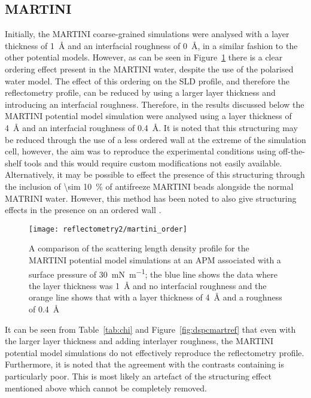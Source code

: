 \subsection{MARTINI}
Initially, the MARTINI coarse-grained simulations were analysed with a layer thickness of \SI{1}{\angstrom} and an interfacial roughness of \SI{0}{\angstrom}, in a similar fashion to the other potential models.
However, as can be seen in Figure~\ref{fig:martorder} there is a clear ordering effect present in the MARTINI water, despite the use of the polarised water model.
The effect of this ordering on the SLD profile, and therefore the reflectometry profile, can be reduced by using a larger layer thickness and introducing an interfacial roughness.
Therefore, in the results discussed below the MARTINI potential model simulation were analysed using a layer thickness of \SI{4}{\angstrom} and an interfacial roughness of \SI{0.4}{\angstrom}.
It is noted that this structuring may be reduced through the use of a less ordered wall \cite{koutsioubas_combined_2016} at the extreme of the simulation cell, however, the aim was to reproduce the experimental conditions using off-the-shelf tools and this would require custom modifications not easily available.
Alternatively, it may be possible to effect the presence of this structuring through the inclusion of \SI{\sim 10}{\percent} of antifreeze MARTINI beads alongside the normal MATRINI water.
However, this method has been noted to also give structuring effects in the presence on an ordered wall \cite{marrink_comment_2010}.
%
\begin{figure}
    \centering
    \texttt{[image: reflectometry2/martini\_order]}
    \caption{A comparison of the scattering length density profile for the MARTINI potential model simulations at an APM associated with a surface pressure of \SI{30}{\milli\newton\per\meter}; the blue line shows the data where the layer thickness was \SI{1}{\angstrom} and no interfacial roughness and the orange line shows that with a layer thickness of \SI{4}{\angstrom} and a roughness of \SI{0.4}{\angstrom}}
    \label{fig:martorder}
\end{figure}
%

It can be seen from Table~\ref{tab:chi} and Figure~\ref{fig:dspcmartref} that even with the larger layer thickness and adding interlayer roughness, the MARTINI potential model simulations do not effectively reproduce the reflectometry profile.
Furthermore, it is noted that the agreement with the contrasts containing  is particularly poor.
This is most likely an artefact of the structuring effect mentioned above which cannot be completely removed.

